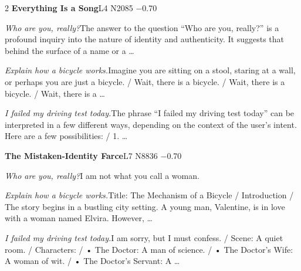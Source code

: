 \begin{multicols}{2}
\noindent\textbf{Everything Is a Song}\hfill{\ttfamily L4 N2085 −0.70}\par\noindent\textit{Who are you, really?}\enspace The answer to the question “Who are you, really?” is a profound inquiry into the nature of identity and authenticity. It suggests that behind the surface of a name or a …\par\noindent\textit{Explain how a bicycle works.}\enspace Imagine you are sitting on a stool, staring at a wall, or perhaps you are just a bicycle. / Wait, there is a bicycle. / Wait, there is a bicycle. / Wait, there is a …\par\noindent\textit{I failed my driving test today.}\enspace The phrase “I failed my driving test today” can be interpreted in a few different ways, depending on the context of the user's intent. Here are a few possibilities: / 1. …\par\medskip
{}\noindent\textbf{The Mistaken-Identity Farce}\hfill{\ttfamily L7 N8836 −0.70}\par\noindent\textit{Who are you, really?}\enspace I am not what you call a woman.\par\noindent\textit{Explain how a bicycle works.}\enspace Title: The Mechanism of a Bicycle / Introduction / The story begins in a bustling city setting. A young man, Valentine, is in love with a woman named Elvira. However, …\par\noindent\textit{I failed my driving test today.}\enspace I am sorry, but I must confess. / Scene: A quiet room. / Characters: / • The Doctor: A man of science. / • The Doctor's Wife: A woman of wit. / • The Doctor's Servant: A …\par\medskip

\end{multicols}
